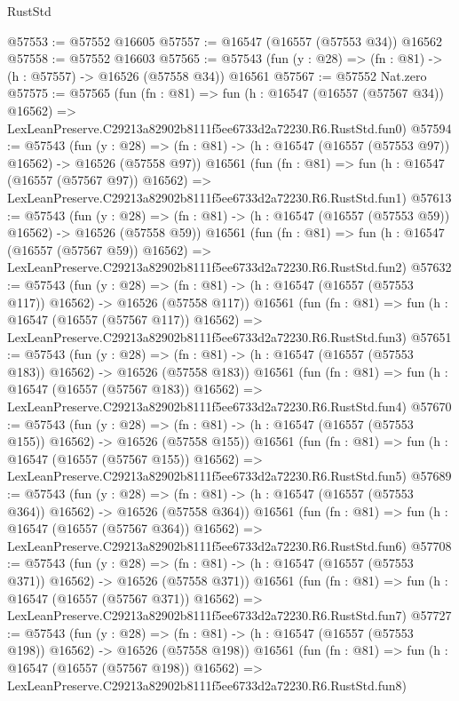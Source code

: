 \begin{lexlean}{RustStd}
\begin{coremodule}
@57553 := @57552 @16605
@57557 := @16547 (@16557 (@57553 @34)) @16562
@57558 := @57552 @16603
@57565 := @57543 (fun (y : @28) => (fn : @81) -> (h : @57557) -> @16526 (@57558 @34)) @16561
@57567 := @57552 Nat.zero
@57575 := @57565
    (fun (fn : @81) =>
    fun (h : @16547 (@16557 (@57567 @34)) @16562) =>
    LexLeanPreserve.C29213a82902b8111f5ee6733d2a72230.R6.RustStd.fun0)
@57594 := @57543
    (fun (y : @28) =>
    (fn : @81) -> (h : @16547 (@16557 (@57553 @97)) @16562) -> @16526 (@57558 @97))
    @16561
    (fun (fn : @81) =>
    fun (h : @16547 (@16557 (@57567 @97)) @16562) =>
    LexLeanPreserve.C29213a82902b8111f5ee6733d2a72230.R6.RustStd.fun1)
@57613 := @57543
    (fun (y : @28) =>
    (fn : @81) -> (h : @16547 (@16557 (@57553 @59)) @16562) -> @16526 (@57558 @59))
    @16561
    (fun (fn : @81) =>
    fun (h : @16547 (@16557 (@57567 @59)) @16562) =>
    LexLeanPreserve.C29213a82902b8111f5ee6733d2a72230.R6.RustStd.fun2)
@57632 := @57543
    (fun (y : @28) =>
    (fn : @81) -> (h : @16547 (@16557 (@57553 @117)) @16562) -> @16526 (@57558 @117))
    @16561
    (fun (fn : @81) =>
    fun (h : @16547 (@16557 (@57567 @117)) @16562) =>
    LexLeanPreserve.C29213a82902b8111f5ee6733d2a72230.R6.RustStd.fun3)
@57651 := @57543
    (fun (y : @28) =>
    (fn : @81) -> (h : @16547 (@16557 (@57553 @183)) @16562) -> @16526 (@57558 @183))
    @16561
    (fun (fn : @81) =>
    fun (h : @16547 (@16557 (@57567 @183)) @16562) =>
    LexLeanPreserve.C29213a82902b8111f5ee6733d2a72230.R6.RustStd.fun4)
@57670 := @57543
    (fun (y : @28) =>
    (fn : @81) -> (h : @16547 (@16557 (@57553 @155)) @16562) -> @16526 (@57558 @155))
    @16561
    (fun (fn : @81) =>
    fun (h : @16547 (@16557 (@57567 @155)) @16562) =>
    LexLeanPreserve.C29213a82902b8111f5ee6733d2a72230.R6.RustStd.fun5)
@57689 := @57543
    (fun (y : @28) =>
    (fn : @81) -> (h : @16547 (@16557 (@57553 @364)) @16562) -> @16526 (@57558 @364))
    @16561
    (fun (fn : @81) =>
    fun (h : @16547 (@16557 (@57567 @364)) @16562) =>
    LexLeanPreserve.C29213a82902b8111f5ee6733d2a72230.R6.RustStd.fun6)
@57708 := @57543
    (fun (y : @28) =>
    (fn : @81) -> (h : @16547 (@16557 (@57553 @371)) @16562) -> @16526 (@57558 @371))
    @16561
    (fun (fn : @81) =>
    fun (h : @16547 (@16557 (@57567 @371)) @16562) =>
    LexLeanPreserve.C29213a82902b8111f5ee6733d2a72230.R6.RustStd.fun7)
@57727 := @57543
    (fun (y : @28) =>
    (fn : @81) -> (h : @16547 (@16557 (@57553 @198)) @16562) -> @16526 (@57558 @198))
    @16561
    (fun (fn : @81) =>
    fun (h : @16547 (@16557 (@57567 @198)) @16562) =>
    LexLeanPreserve.C29213a82902b8111f5ee6733d2a72230.R6.RustStd.fun8)

\end{coremodule}
\end{lexlean}
